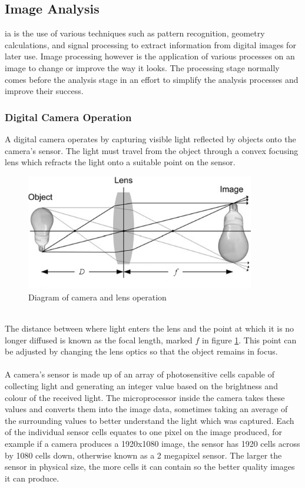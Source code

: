 \subsection{Image Analysis}
	\gls{ia} is the use of various techniques such as pattern recognition, 
	geometry calculations, and signal processing to extract information from 
	digital images for later use. Image processing however is the application 
	of various processes on an image to change or improve the way it looks. The 
	processing stage normally comes before the analysis stage in an effort to 
	simplify the analysis processes and improve their success.
	\subsubsection{Digital Camera Operation}
	A digital camera operates by capturing visible light reflected by objects 
	onto the camera's sensor. The light must travel from the object through a convex focusing lens 
	which refracts the light onto a suitable point on the sensor.
	\begin{figure}[h!]
		\centering
		\includegraphics[width=10cm]{../images/camera_bulb.PNG}
		\caption{Diagram of camera and lens operation}
		\label{fig:camera_diagram}
	\end{figure}
	\\
	The distance between where light enters the lens and the point at which it is no longer 
	diffused is known as the focal length, marked $f$ in figure \ref{fig:camera_diagram}. This 
	point can be adjusted by changing the lens optics so that the object remains in focus.
	\\\\
	A camera's sensor is made up of an array of photosensitive cells capable of collecting light 
	and generating an integer value based on the brightness and colour of the received light. The 
	microprocessor inside the camera takes these values and converts them into the image data, 
	sometimes taking an average of the surrounding values to better understand the light which was 
	captured. Each of the individual sensor cells equates to one pixel on the image produced, for 
	example if a camera produces a 1920x1080 image, the sensor has 1920 cells across by 
	1080 cells down, otherwise known as a 2 megapixel sensor. The larger the sensor in physical 
	size, the more cells it can contain so the better quality images it can produce.
